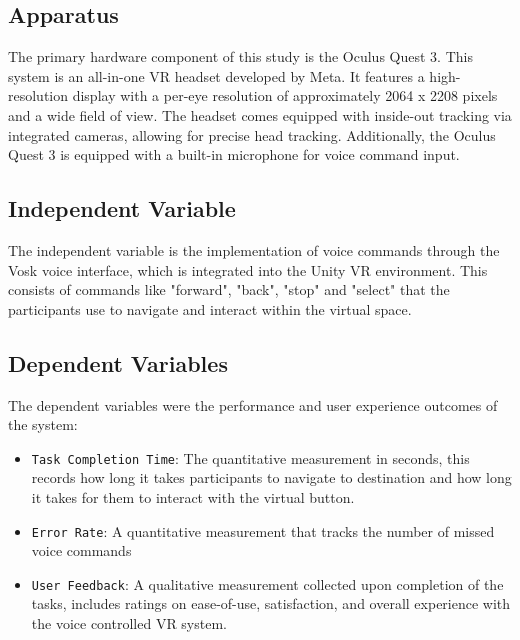 \documentclass[manuscript, screen, review]{acmart}
\begin{document}
\subsection{Apparatus}
The primary hardware component of this study is the Oculus Quest 3. This system is an all-in-one VR headset developed by Meta. It features a high-resolution display with a per-eye resolution of approximately 2064 x 2208 pixels and a wide field of view. The headset comes equipped with inside-out tracking via integrated cameras, allowing for precise head tracking. Additionally, the Oculus Quest 3 is equipped with a built-in microphone for voice command input. 



\subsection{Independent Variable}
The independent variable is the implementation of  voice commands through the Vosk voice interface, which is integrated into the Unity VR environment. This  consists of commands like "forward", "back", "stop" and  "select" that the participants use to navigate and interact within the virtual space.

\subsection{Dependent Variables}
The dependent variables were the performance and user experience outcomes of the system:
\begin{itemize}
\item {\texttt{Task Completion Time}}: The quantitative measurement in seconds, this records how long it takes participants to navigate to destination and how long it takes for them to interact with the virtual button. 
\item {\texttt{Error Rate}}: A quantitative measurement that tracks the number of missed voice commands
\item {\texttt{User Feedback}}: A qualitative measurement collected upon completion of the tasks, includes ratings on ease-of-use, satisfaction, and overall experience with the voice controlled VR system.  
\end{itemize}
\end{document}
